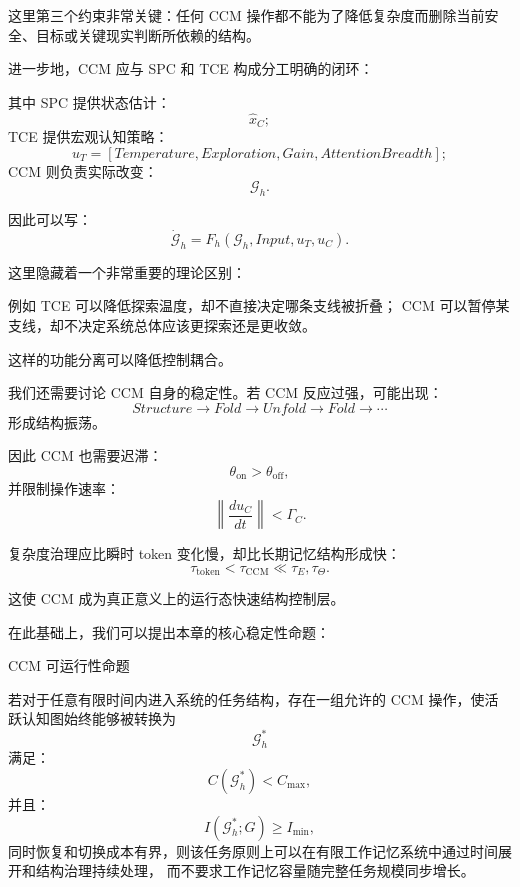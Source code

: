 这里第三个约束非常关键：任何 CCM 操作都不能为了降低复杂度而删除当前安全、目标或关键现实判断所依赖的结构。

进一步地，CCM 应与 SPC 和 TCE 构成分工明确的闭环：
\begin{statementbox}
\centering
{}
\end{statementbox}

其中 SPC 提供状态估计：
\[
\widehat x_C;
\]
TCE 提供宏观认知策略：
\[
u_T
=
[
Temperature,
Exploration,
Gain,
AttentionBreadth
];
\]
CCM 则负责实际改变：
\[
\mathcal G_h.
\]

因此可以写：
\[
\dot{\mathcal G}_h
=
F_h(
\mathcal G_h,
Input,
u_T,
u_C
).
\]

这里隐藏着一个非常重要的理论区别：
\begin{statementbox}
\centering
{}
\end{statementbox}

例如 TCE 可以降低探索温度，却不直接决定哪条支线被折叠；
CCM 可以暂停某支线，却不决定系统总体应该更探索还是更收敛。

这样的功能分离可以降低控制耦合。

我们还需要讨论 CCM 自身的稳定性。若 CCM 反应过强，可能出现：
\[
Structure
\rightarrow
Fold
\rightarrow
Unfold
\rightarrow
Fold
\rightarrow\cdots
\]
形成结构振荡。

因此 CCM 也需要迟滞：
\[
\theta_{\mathrm{on}}
>
\theta_{\mathrm{off}},
\]
并限制操作速率：
\[
\left\|
\frac{d u_C}{dt}
\right\|
<
\Gamma_C.
\]

复杂度治理应比瞬时 token 变化慢，却比长期记忆结构形成快：
\[
\tau_{\mathrm{token}}
<
\tau_{\mathrm{CCM}}
\ll
\tau_E,
\tau_\Theta.
\]

这使 CCM 成为真正意义上的运行态快速结构控制层。

在此基础上，我们可以提出本章的核心稳定性命题：

\begin{proposition*}
CCM 可运行性命题
\end{proposition*}

若对于任意有限时间内进入系统的任务结构，存在一组允许的 CCM 操作，使活跃认知图始终能够被转换为
\[
\mathcal G_h^*
\]
满足：
\[
C(\mathcal G_h^*)<C_{\max},
\]
并且：
\[
I(\mathcal G_h^*;G)
\ge I_{\min},
\]
同时恢复和切换成本有界，则该任务原则上可以在有限工作记忆系统中通过时间展开和结构治理持续处理，
而不要求工作记忆容量随完整任务规模同步增长。

